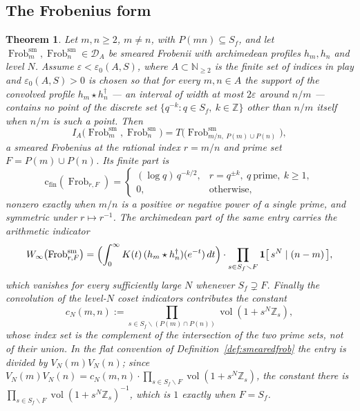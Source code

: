\documentclass[11pt]{amsart}
\newtheorem{theorem}{Theorem}[section]
\theoremstyle{definition}
\theoremstyle{remark}
\newcommand{\N}{\mathbb N}
\newcommand{\Z}{\mathbb Z}
\newcommand{\Frob}{\operatorname{Frob}}
\newcommand{\vol}{\operatorname{vol}}
\newcommand{\DA}{\mathcal D_A}
\newcommand{\cfin}{\mathrm{c}_{\mathrm{fin}}}
\begin{document}
\subsection{The Frobenius form}

\begin{theorem}\label{thm:gramoff}
Let $m,n\ge2$, $m\ne n$, with $P(mn)\subseteq S_f$, and let
$\Frob_m^{\mathrm{sm}},\Frob_n^{\mathrm{sm}}\in\DA$ be smeared Frobenii with
archimedean profiles $h_m,h_n$ and level $N$. Assume
$\varepsilon<\varepsilon_0(A,S)$, where $A\subset\N_{\ge2}$ is the finite set
of indices in play and $\varepsilon_0(A,S)>0$ is chosen so that for every
$m,n\in A$ the support of the convolved profile $h_m\star h_n^\dagger$ --- an
interval of width at most $2\varepsilon$ around $n/m$ --- contains no point of
the discrete set $\{q^{-k}:q\in S_f,\ k\in\Z\}$ other than $n/m$ itself when
$n/m$ is such a point. Then
\begin{equation}\label{eq:gramoffentry}
  I_A\bigl(\Frob_m^{\mathrm{sm}},\Frob_n^{\mathrm{sm}}\bigr)
   =T\bigl(\Frob^{\mathrm{sm}}_{m/n,\ P(m)\cup P(n)}\bigr),
\end{equation}
a smeared Frobenius at the rational index $r=m/n$ and prime set
$F=P(m)\cup P(n)$. Its finite part is
\begin{equation}\label{eq:gramfinite}
  \cfin(\Frob_{r,F})=
  \begin{cases}
    (\log q)\,q^{-k/2}, & r=q^{\pm k},\ q\ \text{prime},\ k\ge1,\\
    0, & \text{otherwise},
  \end{cases}
\end{equation}
nonzero exactly when $m/n$ is a positive or negative power of a single prime,
and symmetric under $r\mapsto r^{-1}$. The archimedean part of the same entry
carries the arithmetic indicator
\begin{equation}\label{eq:gramarch}
  W_\infty\bigl(\Frob_{r,F}^{\mathrm{sm}}\bigr)
   =\Bigl(\int_0^\infty K(t)\,(h_m\star h_n^\dagger)(e^{-t})\,dt\Bigr)
    \cdot\prod_{s\in S_f\smallsetminus F}
    \mathbf 1\bigl[\,s^N\mid(n-m)\,\bigr],
\end{equation}
which vanishes for every sufficiently large $N$ whenever $S_f\supsetneq F$.
Finally the convolution of the level-$N$ coset indicators contributes the
constant
\begin{equation}\label{eq:gramconst}
  c_N(m,n):=\prod_{s\in S_f\smallsetminus(P(m)\cap P(n))}\vol(1+s^N\Z_s),
\end{equation}
whose index set is the complement of the \emph{intersection} of the two prime
sets, not of their union. In the flat convention of
Definition~\ref{def:smearedfrob} the entry is divided by $V_N(m)V_N(n)$; since
$V_N(m)V_N(n)=c_N(m,n)\cdot\prod_{s\in S_f\smallsetminus F}\vol(1+s^N\Z_s)$,
the constant there is $\prod_{s\in S_f\smallsetminus F}\vol(1+s^N\Z_s)^{-1}$,
which is $1$ exactly when $F=S_f$.
\end{theorem}
\end{document}

